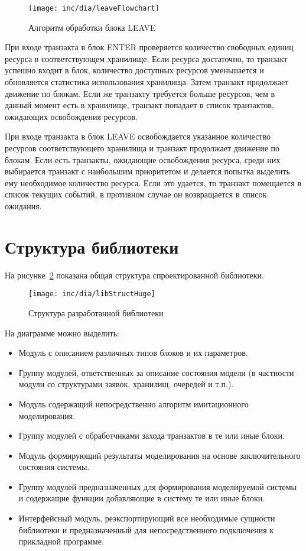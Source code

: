 \begin{figure}[ht]
  \centering
  \texttt{[image: inc/dia/leaveFlowchart]}
  \caption{Алгоритм обработки блока LEAVE}
  \label{fig:leaveFlowchart}
\end{figure}

При входе транзакта в блок ENTER проверяется количество свободных единиц ресурса в соответствующем хранилище. Если ресурса достаточно, то транзакт успешно входит в блок, количество доступных ресурсов уменьшается и обновляется статистика использования хранилища. Затем транзакт продолжает движение по блокам. Если же транзакту требуется больше ресурсов, чем в данный момент есть в хранилище, транзакт попадает в список транзактов, ожидающих освобождения ресурсов.

При входе транзакта в блок LEAVE освобождается указанное количество ресурсов соответствующего хранилища и транзакт продолжает движение по блокам. Если есть транзакты, ожидающие освобождения ресурса, среди них выбирается транзакт с наибольшим приоритетом и делается попытка выделить ему необходимое количество ресурса. Если это удается, то транзакт помещается в список текущих событий, в противном случае он возвращается в список ожидания.

\section{Структура библиотеки}

На рисунке~\ref{fig:libStruct} показана общая структура спроектированной библиотеки.

\begin{figure}[ht]
  \centering
  \texttt{[image: inc/dia/libStructHuge]}
  \caption{Структура разработанной библиотеки}
  \label{fig:libStruct}
\end{figure}

На диаграмме можно выделить:

\begin{itemize}
\item {Модуль с описанием различных типов блоков и их параметров.}
\item {Группу модулей, ответственных за описание состояния модели (в частности модули со структурами заявок, хранилищ, очередей и т.п.).}
\item {Модуль содержащий непосредственно алгоритм имитационного моделирования.}
\item {Группу модулей с обработчиками захода транзактов в те или иные блоки.}
\item {Модуль формирующий результаты моделирования на основе заключительного состояния системы.}
\item {Группу модулей предназначенных для формирования моделируемой системы и содержащие функции добавляющие в систему те или иные блоки.}
\item {Интерфейсный модуль, реэкспортирующий все необходимые сущности библиотеки и предназначенный для непосредственного подключения к прикладной программе.}

\end{itemize}

